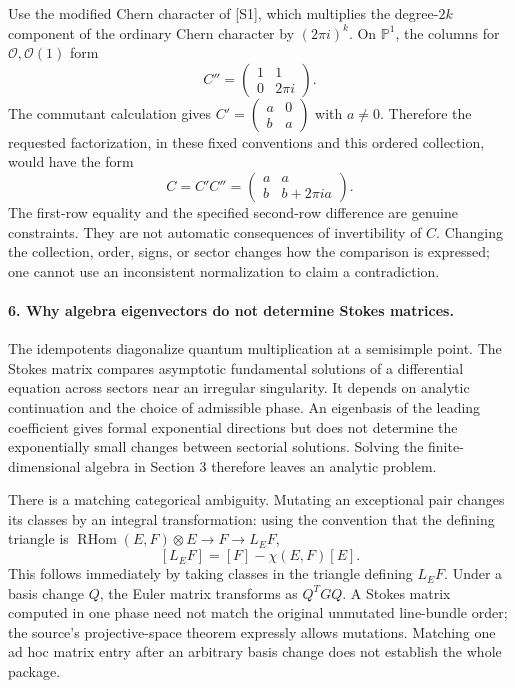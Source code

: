 \documentclass[11pt]{article}
\begin{document}
Use the modified Chern character of [S1], which multiplies the degree-$2k$ component of the ordinary Chern character by $(2\pi i)^k$. On $\mathbb P^1$, the columns for $\mathcal O,\mathcal O(1)$ form
\[
 C''=\begin{pmatrix}1&1\\0&2\pi i\end{pmatrix}.
\]
The commutant calculation gives $C'=\left(\begin{smallmatrix}a&0\\b&a\end{smallmatrix}\right)$ with $a\ne0$. Therefore the requested factorization, in these fixed conventions and this ordered collection, would have the form
\[
 C=C'C''=\begin{pmatrix}a&a\\b&b+2\pi i a\end{pmatrix}.
\]
The first-row equality and the specified second-row difference are genuine constraints. They are not automatic consequences of invertibility of $C$. Changing the collection, order, signs, or sector changes how the comparison is expressed; one cannot use an inconsistent normalization to claim a contradiction.

\paragraph{6. Why algebra eigenvectors do not determine Stokes matrices.}
The idempotents diagonalize quantum multiplication at a semisimple point. The Stokes matrix compares asymptotic fundamental solutions of a differential equation across sectors near an irregular singularity. It depends on analytic continuation and the choice of admissible phase. An eigenbasis of the leading coefficient gives formal exponential directions but does not determine the exponentially small changes between sectorial solutions. Solving the finite-dimensional algebra in Section 3 therefore leaves an analytic problem.

There is a matching categorical ambiguity. Mutating an exceptional pair changes its classes by an integral transformation: using the convention that the defining triangle is $\operatorname{RHom}(E,F)\otimes E\to F\to L_EF$,
\[
 [L_EF]=[F]-\chi(E,F)[E].
\]
This follows immediately by taking classes in the triangle defining $L_EF$. Under a basis change $Q$, the Euler matrix transforms as $Q^TGQ$. A Stokes matrix computed in one phase need not match the original unmutated line-bundle order; the source's projective-space theorem expressly allows mutations. Matching one ad hoc matrix entry after an arbitrary basis change does not establish the whole package.
\end{document}
